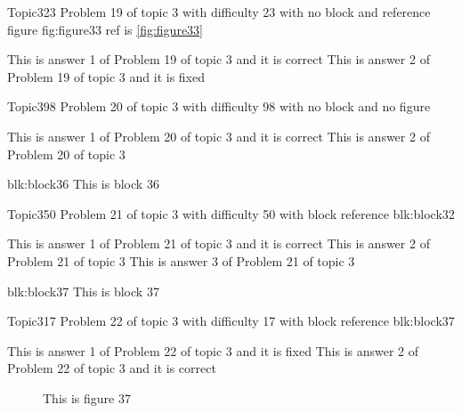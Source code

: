 \documentclass[master]{exam}
\begin{document}
\begin{problem}{Topic3}{23}
	Problem 19 of topic 3 with difficulty 23 with no block and reference figure fig:figure33 ref is \ref{fig:figure33}
	\begin{answers}
		\answer[correct] This is answer 1 of Problem 19 of topic 3 and it is correct
		\answer[fixed] This is answer 2 of Problem 19 of topic 3 and it is fixed
	\end{answers}
\end{problem}

\begin{problem}{Topic3}{98}
	Problem 20 of topic 3 with difficulty 98 with no block and no figure
	\begin{answers}
		\answer[correct] This is answer 1 of Problem 20 of topic 3 and it is correct
		\answer This is answer 2 of Problem 20 of topic 3 
	\end{answers}
\end{problem}



\begin{block}{blk:block36}
This is block 36
\end{block}


\begin{problem}[requires=blk:block32]{Topic3}{50}
	Problem 21 of topic 3 with difficulty 50 with block reference blk:block32
	\begin{answers}
		\answer[correct] This is answer 1 of Problem 21 of topic 3 and it is correct
		\answer This is answer 2 of Problem 21 of topic 3 
		\answer This is answer 3 of Problem 21 of topic 3 
	\end{answers}
\end{problem}



\begin{block}{blk:block37}
This is block 37
\end{block}


\begin{problem}[requires=blk:block37]{Topic3}{17}
	Problem 22 of topic 3 with difficulty 17 with block reference blk:block37
	\begin{answers}
		\answer[fixed] This is answer 1 of Problem 22 of topic 3 and it is fixed
		\answer[correct] This is answer 2 of Problem 22 of topic 3 and it is correct
	\end{answers}
\end{problem}



\begin{figure}
	\begin{center}
		This is figure 37 
		\label{fig:figure37}
	\end{center}
\end{figure}
\end{document}
